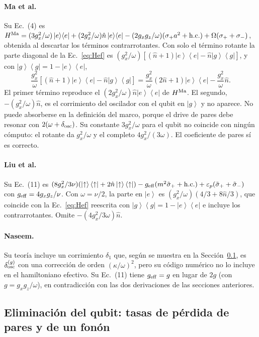 \documentclass[11pt,a4paper]{article}
\newcommand{\ket}[1]{\left|#1\right\rangle}
\newcommand{\bra}[1]{\left\langle#1\right|}
\newcommand{\spl}{\sigma_{+}}
\newcommand{\smi}{\sigma_{-}}
\newcommand{\Pe}{\ket{e}\!\bra{e}}
\newcommand{\Pg}{\ket{g}\!\bra{g}}
\newcommand{\hn}{\hat n}
\theoremstyle{definition}
\begin{document}
\paragraph{Ma et al.} Su Ec.~(4) es $H^{\rm Ma}=(3g_x^2/\omega)\Pe+(2g_x^2/\omega)\hn\Pe-(2g_xg_z/\omega)(\spl a^2+\mathrm{h.c.})+\Omega(\spl+\smi)$, obtenida al descartar los términos contrarrotantes. Con solo el término rotante la parte diagonal de la Ec.~\eqref{eq:Hef} es $(g_x^2/\omega)[(\hn+1)\Pe-\hn\Pg]$, y con $\Pg=1-\Pe$,
\begin{equation}
\frac{g_x^2}{\omega}\left[(\hn+1)\Pe-\hn\Pg\right]=\frac{g_x^2}{\omega}(2\hn+1)\Pe-\frac{g_x^2}{\omega}\hn.
\end{equation}
El primer término reproduce el $(2g_x^2/\omega)\hn\Pe$ de $H^{\rm Ma}$. El segundo, $-(g_x^2/\omega)\hn$, es el corrimiento del oscilador con el qubit en $\ket{g}$ y no aparece. No puede absorberse en la definición del marco, porque el drive de pares debe resonar con $2(\omega+\delta_{\rm osc})$. Su constante $3g_x^2/\omega$ para el qubit no coincide con ningún cómputo: el rotante da $g_x^2/\omega$ y el completo $4g_x^2/(3\omega)$. El coeficiente de pares sí es correcto.

\paragraph{Liu et al.} Su Ec.~(11) es $(8g_x^2/3\nu)(\ket{\uparrow}\bra{\uparrow}+2\hn\ket{\uparrow}\bra{\uparrow})-g_{\rm eff}(m^2\tilde\sigma_++\mathrm{h.c.})+\varepsilon_p(\tilde\sigma_++\tilde\sigma_-)$ con $g_{\rm eff}=4g_xg_z/\nu$. Con $\omega=\nu/2$, la parte en $\ket{e}$ es $(g_x^2/\omega)(4/3+8\hn/3)$, que coincide con la Ec.~\eqref{eq:Hef} reescrita con $\Pg=1-\Pe$ e incluye los contrarrotantes. Omite $-(4g_x^2/3\omega)\hn$.

\paragraph{Naseem.} Su teoría incluye un corrimiento $\delta_1$ que, según se muestra en la Sección~\ref{sec:RS}, es $\delta_{\rm osc}^{(g)}$ con una corrección de orden $(\kappa/\omega)^2$, pero su código numérico no lo incluye en el hamiltoniano efectivo. Su Ec.~(11) tiene $g_{\rm eff}=g$ en lugar de $2g$ (con $g=g_xg_z/\omega$), en contradicción con las dos derivaciones de las secciones anteriores.

\subsection{Eliminación del qubit: tasas de pérdida de pares y de un fonón}
\label{sec:RS}
\end{document}
